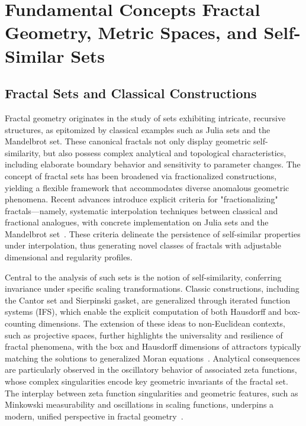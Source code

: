 \documentclass[sigconf]{acmart}
\begin{document}
\section{Fundamental Concepts Fractal Geometry, Metric Spaces, and Self-Similar Sets}

\subsection{Fractal Sets and Classical Constructions}

Fractal geometry originates in the study of sets exhibiting intricate, recursive structures, as epitomized by classical examples such as Julia sets and the Mandelbrot set. These canonical fractals not only display geometric self-similarity, but also possess complex analytical and topological characteristics, including elaborate boundary behavior and sensitivity to parameter changes. The concept of fractal sets has been broadened via fractionalized constructions, yielding a flexible framework that accommodates diverse anomalous geometric phenomena. Recent advances introduce explicit criteria for "fractionalizing" fractals—namely, systematic interpolation techniques between classical and fractional analogues, with concrete implementation on Julia sets and the Mandelbrot set~\cite{ref106}. These criteria delineate the persistence of self-similar properties under interpolation, thus generating novel classes of fractals with adjustable dimensional and regularity profiles.

Central to the analysis of such sets is the notion of self-similarity, conferring invariance under specific scaling transformations. Classic constructions, including the Cantor set and Sierpinski gasket, are generalized through iterated function systems (IFS), which enable the explicit computation of both Hausdorff and box-counting dimensions. The extension of these ideas to non-Euclidean contexts, such as projective spaces, further highlights the universality and resilience of fractal phenomena, with the box and Hausdorff dimensions of attractors typically matching the solutions to generalized Moran equations~\cite{ref24,ref33}. Analytical consequences are particularly observed in the oscillatory behavior of associated zeta functions, whose complex singularities encode key geometric invariants of the fractal set. The interplay between zeta function singularities and geometric features, such as Minkowski measurability and oscillations in scaling functions, underpins a modern, unified perspective in fractal geometry~\cite{ref21,ref23,ref33}.
\end{document}
